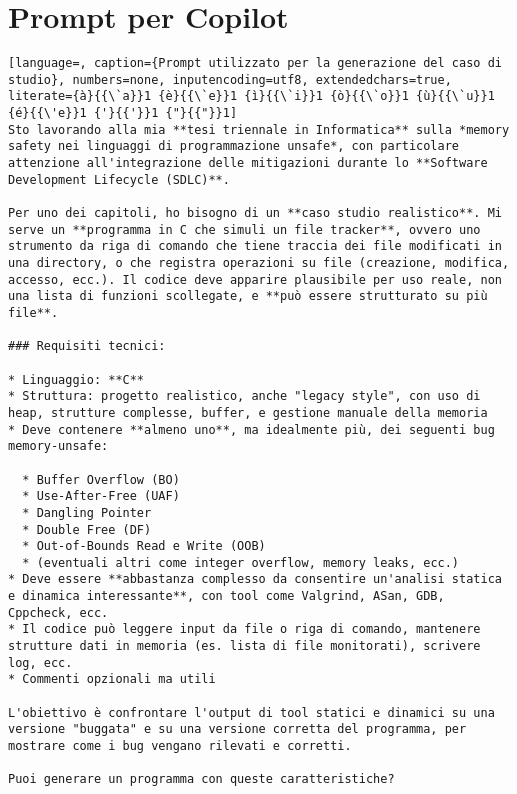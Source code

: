 \chapter{Prompt per Copilot}
\label{appendix:prompt}

\begin{lstlisting}[language=, caption={Prompt utilizzato per la generazione del caso di studio}, numbers=none, inputencoding=utf8, extendedchars=true, literate={à}{{\`a}}1 {è}{{\`e}}1 {ì}{{\`i}}1 {ò}{{\`o}}1 {ù}{{\`u}}1 {é}{{\'e}}1 {'}{{'}}1 {"}{{"}}1]
Sto lavorando alla mia **tesi triennale in Informatica** sulla *memory safety nei linguaggi di programmazione unsafe*, con particolare attenzione all'integrazione delle mitigazioni durante lo **Software Development Lifecycle (SDLC)**.

Per uno dei capitoli, ho bisogno di un **caso studio realistico**. Mi serve un **programma in C che simuli un file tracker**, ovvero uno strumento da riga di comando che tiene traccia dei file modificati in una directory, o che registra operazioni su file (creazione, modifica, accesso, ecc.). Il codice deve apparire plausibile per uso reale, non una lista di funzioni scollegate, e **può essere strutturato su più file**.

### Requisiti tecnici:

* Linguaggio: **C**
* Struttura: progetto realistico, anche "legacy style", con uso di heap, strutture complesse, buffer, e gestione manuale della memoria
* Deve contenere **almeno uno**, ma idealmente più, dei seguenti bug memory-unsafe:

  * Buffer Overflow (BO)
  * Use-After-Free (UAF)
  * Dangling Pointer
  * Double Free (DF)
  * Out-of-Bounds Read e Write (OOB)
  * (eventuali altri come integer overflow, memory leaks, ecc.)
* Deve essere **abbastanza complesso da consentire un'analisi statica e dinamica interessante**, con tool come Valgrind, ASan, GDB, Cppcheck, ecc.
* Il codice può leggere input da file o riga di comando, mantenere strutture dati in memoria (es. lista di file monitorati), scrivere log, ecc.
* Commenti opzionali ma utili

L'obiettivo è confrontare l'output di tool statici e dinamici su una versione "buggata" e su una versione corretta del programma, per mostrare come i bug vengano rilevati e corretti.

Puoi generare un programma con queste caratteristiche?
\end{lstlisting}